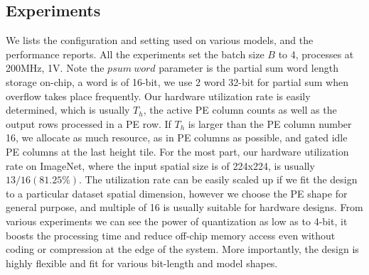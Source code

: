 \begin{table}[h!]
    \caption{Performance summary Batch=4}
    \label{tab:perf_sum}
    \centering
    \footnotesize 
\end{table}
\subsection{Experiments} 
We lists the configuration and setting used on various models, and the performance reports. All the experiments set the batch size $B$ to 4, processes at 200MHz, 1V. Note the $psum\ word$ parameter is the partial sum word length storage on-chip, a word is of 16-bit, we use 2 word 32-bit for partial sum when overflow takes place frequently. Our hardware utilization rate is easily determined, which is usually $T_h$, the active PE column counts as well as the output rows processed in a PE row. If $T_h$ is larger than the PE column number 16, we allocate as much resource, as in PE columns as possible, and gated idle PE columns at the last height tile. For the most part, our hardware utilization rate on ImageNet, where the input spatial size is of 224x224, is usually $13/16(81.25\%)$. The utilization rate can be easily scaled up if we fit the design to a particular dataset spatial dimension, however we choose the PE shape for general purpose, and multiple of 16 is usually suitable for hardware designs. From various experiments we can see the power of quantization as low as to 4-bit, it boosts the processing time and reduce off-chip memory access even without coding or compression at the edge of the system. More importantly, the design is highly flexible and fit for various bit-length and model shapes. \\

